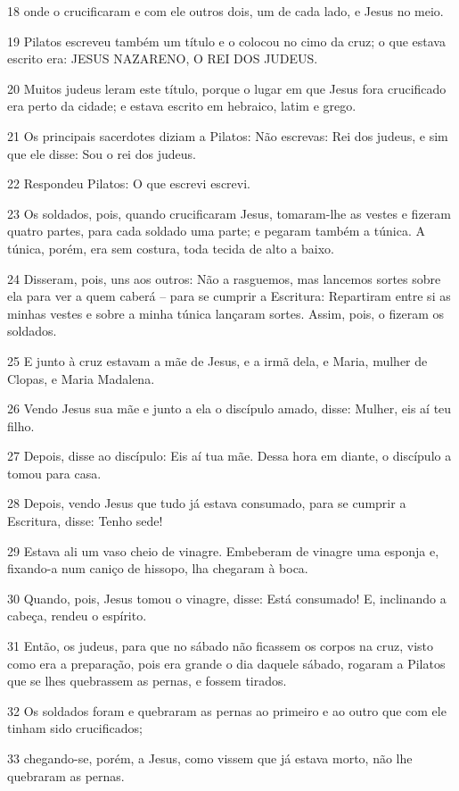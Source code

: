 \par 18 onde o crucificaram e com ele outros dois, um de cada lado, e Jesus no meio.
\par 19 Pilatos escreveu também um título e o colocou no cimo da cruz; o que estava escrito era: JESUS NAZARENO, O REI DOS JUDEUS.
\par 20 Muitos judeus leram este título, porque o lugar em que Jesus fora crucificado era perto da cidade; e estava escrito em hebraico, latim e grego.
\par 21 Os principais sacerdotes diziam a Pilatos: Não escrevas: Rei dos judeus, e sim que ele disse: Sou o rei dos judeus.
\par 22 Respondeu Pilatos: O que escrevi escrevi.
\par 23 Os soldados, pois, quando crucificaram Jesus, tomaram-lhe as vestes e fizeram quatro partes, para cada soldado uma parte; e pegaram também a túnica. A túnica, porém, era sem costura, toda tecida de alto a baixo.
\par 24 Disseram, pois, uns aos outros: Não a rasguemos, mas lancemos sortes sobre ela para ver a quem caberá -- para se cumprir a Escritura: Repartiram entre si as minhas vestes e sobre a minha túnica lançaram sortes. Assim, pois, o fizeram os soldados.
\par 25 E junto à cruz estavam a mãe de Jesus, e a irmã dela, e Maria, mulher de Clopas, e Maria Madalena.
\par 26 Vendo Jesus sua mãe e junto a ela o discípulo amado, disse: Mulher, eis aí teu filho.
\par 27 Depois, disse ao discípulo: Eis aí tua mãe. Dessa hora em diante, o discípulo a tomou para casa.
\par 28 Depois, vendo Jesus que tudo já estava consumado, para se cumprir a Escritura, disse: Tenho sede!
\par 29 Estava ali um vaso cheio de vinagre. Embeberam de vinagre uma esponja e, fixando-a num caniço de hissopo, lha chegaram à boca.
\par 30 Quando, pois, Jesus tomou o vinagre, disse: Está consumado! E, inclinando a cabeça, rendeu o espírito.
\par 31 Então, os judeus, para que no sábado não ficassem os corpos na cruz, visto como era a preparação, pois era grande o dia daquele sábado, rogaram a Pilatos que se lhes quebrassem as pernas, e fossem tirados.
\par 32 Os soldados foram e quebraram as pernas ao primeiro e ao outro que com ele tinham sido crucificados;
\par 33 chegando-se, porém, a Jesus, como vissem que já estava morto, não lhe quebraram as pernas.
